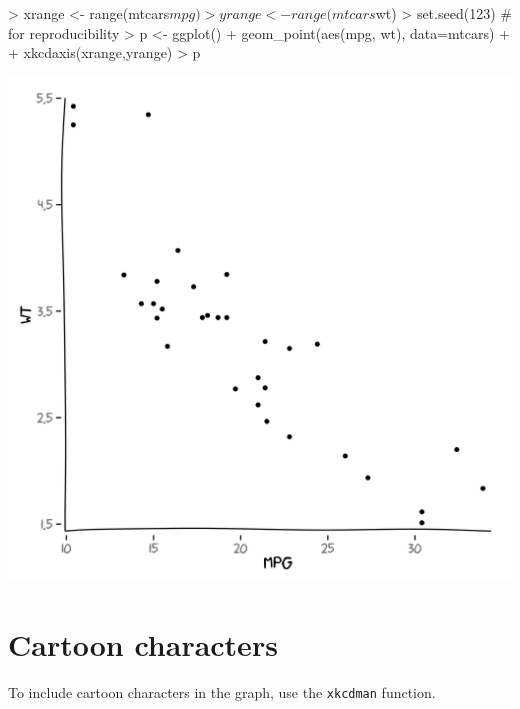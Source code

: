 \documentclass[10pt]{article}
\begin{document}
\begin{center}
\begin{Schunk}
\begin{Sinput}
> xrange <- range(mtcars$mpg)
> yrange <- range(mtcars$wt)
> set.seed(123) # for reproducibility
> p <- ggplot() + geom_point(aes(mpg, wt), data=mtcars) + 
+   xkcdaxis(xrange,yrange)
> p
\end{Sinput}
\end{Schunk}
\includegraphics{xkcd-intro-008}
\end{center}



\section{Cartoon characters}

To include cartoon characters in the graph, use the \texttt{xkcdman} function.
\end{document}
